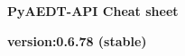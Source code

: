 \documentclass[9pt,landscape]{article}
\begin{document}
\footnotesize
\justifying
\begin{center}
     \Huge{\textbf{PyAEDT-API Cheat sheet}} \\
\end{center}
\begin{center}
\small{\textbf{version:0.6.78 (stable) }} \\
\end{center}
\vspace{-0.15cm}
\noindent\makebox[\linewidth]{\rule{\paperwidth}{2pt}}
\end{document}
